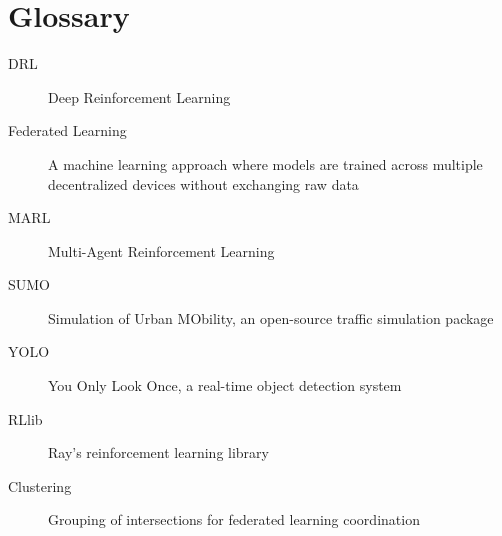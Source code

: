 \section{Glossary}

\begin{description}
\item[DRL] Deep Reinforcement Learning
\item[Federated Learning] A machine learning approach where models are trained across multiple decentralized devices without exchanging raw data
\item[MARL] Multi-Agent Reinforcement Learning
\item[SUMO] Simulation of Urban MObility, an open-source traffic simulation package
\item[YOLO] You Only Look Once, a real-time object detection system
\item[RLlib] Ray's reinforcement learning library
\item[Clustering] Grouping of intersections for federated learning coordination
\end{description}